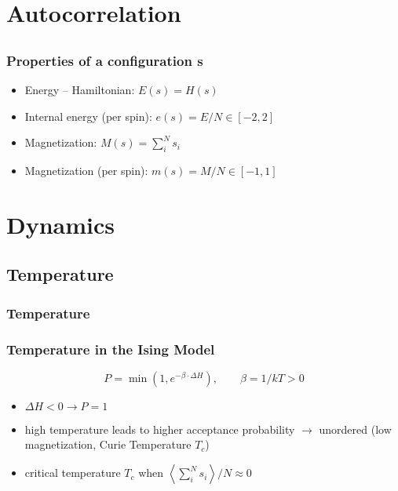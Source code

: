 \documentclass{beamer}
\begin{document}

\section{Autocorrelation}
\subsection{}






\begin{frame}\frametitle{Properties of a configuration s}
\begin{itemize}
\item Energy -- Hamiltonian: $E(s) = H(s)$
\item  Internal energy (per spin): $e(s) = E/N \in [ -2,2]$
\item Magnetization: $M(s) = \sum_i^N s_i$
\item Magnetization (per spin): $m(s) = M/N\in [ -1,1]$
\end{itemize}
\end{frame}



\section{Dynamics}
\subsection{Temperature}
\begin{frame}\frametitle{Temperature}
\end{frame}


\begin{frame}\frametitle{Temperature in the Ising Model}
\begin{equation*}
P = \operatorname{min}\left(1,e^{-\beta\cdot \Delta H}\right),\qquad \beta = 1/kT > 0
\end{equation*}
\begin{itemize}
\item $\Delta H < 0 \rightarrow P = 1$
\item high temperature leads to higher acceptance probability
$\rightarrow$ unordered (low magnetization, Curie Temperature $T_c$)
\item critical temperature $T_c$ when $\left<\sum_i^N s_i\right>/N \approx 0$
\end{itemize}
\end{frame}
\end{document}
